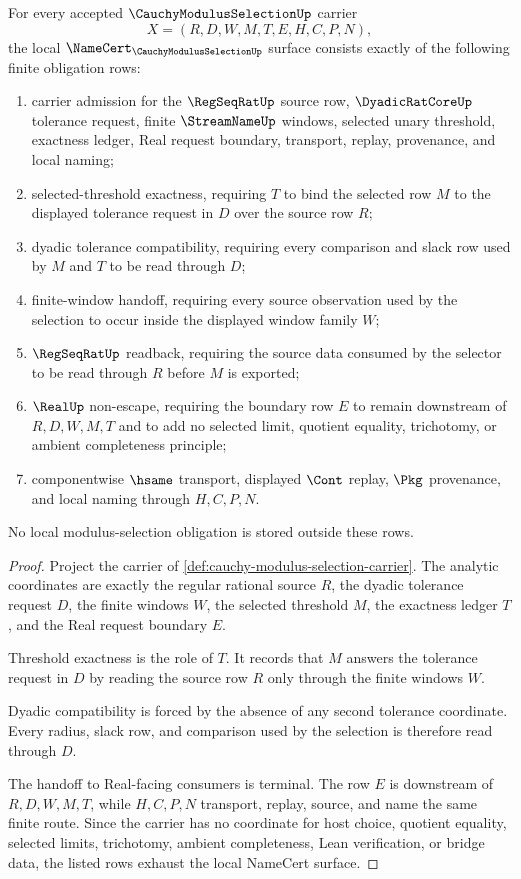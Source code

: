 \begin{theorem}
\label{thm:cauchy-modulus-selection-namecert-obligations}
For every accepted $\CauchyModulusSelectionUp$ carrier
$$
X=(R,D,W,M,T,E,H,C,P,N),
$$
the local $\NameCert_{\CauchyModulusSelectionUp}$ surface consists exactly of the following finite obligation rows:
\begin{enumerate}
\item carrier admission for the $\RegSeqRatUp$ source row, $\DyadicRatCoreUp$ tolerance request, finite $\StreamNameUp$ windows, selected unary threshold, exactness ledger, Real request boundary, transport, replay, provenance, and local naming;
\item selected-threshold exactness, requiring $T$ to bind the selected row $M$ to the displayed tolerance request in $D$ over the source row $R$;
\item dyadic tolerance compatibility, requiring every comparison and slack row used by $M$ and $T$ to be read through $D$;
\item finite-window handoff, requiring every source observation used by the selection to occur inside the displayed window family $W$;
\item $\RegSeqRatUp$ readback, requiring the source data consumed by the selector to be read through $R$ before $M$ is exported;
\item $\RealUp$ non-escape, requiring the boundary row $E$ to remain downstream of $R,D,W,M,T$ and to add no selected limit, quotient equality, trichotomy, or ambient completeness principle;
\item componentwise $\hsame$ transport, displayed $\Cont$ replay, $\Pkg$ provenance, and local naming through $H,C,P,N$.
\end{enumerate}
No local modulus-selection obligation is stored outside these rows.
\end{theorem}
\begin{proof}
Project the carrier of \autoref{def:cauchy-modulus-selection-carrier}. The analytic coordinates are exactly the regular rational source $R$, the dyadic tolerance request $D$, the finite windows $W$, the selected threshold $M$, the exactness ledger $T$, and the Real request boundary $E$.

Threshold exactness is the role of $T$. It records that $M$ answers the tolerance request in $D$ by reading the source row $R$ only through the finite windows $W$.

Dyadic compatibility is forced by the absence of any second tolerance coordinate. Every radius, slack row, and comparison used by the selection is therefore read through $D$.

The handoff to Real-facing consumers is terminal. The row $E$ is downstream of $R,D,W,M,T$, while $H,C,P,N$ transport, replay, source, and name the same finite route. Since the carrier has no coordinate for host choice, quotient equality, selected limits, trichotomy, ambient completeness, Lean verification, or bridge data, the listed rows exhaust the local NameCert surface.
\end{proof}


